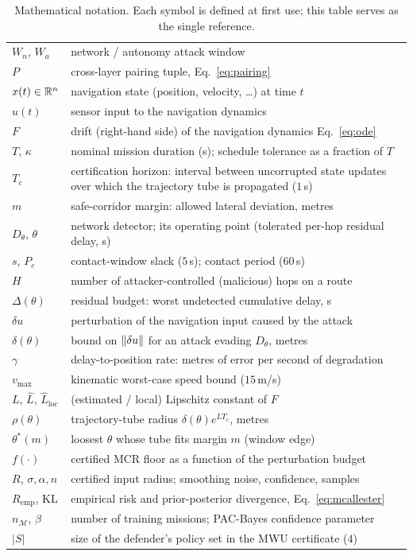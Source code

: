 \begin{table}[t]
\centering
\caption{Mathematical notation. Each symbol is defined at first use; this
table serves as the single reference.}
\label{tab:notation}
\small
\renewcommand{\arraystretch}{1.05}
\begin{tabularx}{\columnwidth}{@{}lX@{}}
\toprule
$W_n$, $W_a$ & network / autonomy attack window\\
$P$ & cross-layer pairing tuple, Eq.~\eqref{eq:pairing}\\
$x(t)\in\mathbb{R}^n$ & navigation state (position, velocity, \dots) at time $t$\\
$u(t)$ & sensor input to the navigation dynamics\\
$F$ & drift (right-hand side) of the navigation dynamics Eq.~\eqref{eq:ode}\\
$T$, $\kappa$ & nominal mission duration (s); schedule tolerance as a
fraction of $T$\\
$T_c$ & certification horizon: interval between uncorrupted state updates
over which the trajectory tube is propagated ($1$\,s)\\
$m$ & safe-corridor margin: allowed lateral deviation, metres\\
$D_\theta$, $\theta$ & network detector; its operating point
(tolerated per-hop residual delay, s)\\
$s$, $P_{\!c}$ & contact-window slack ($5$\,s); contact period ($60$\,s)\\
$H$ & number of attacker-controlled (malicious) hops on a route\\
$\Delta(\theta)$ & residual budget: worst undetected cumulative delay, s\\
$\delta u$ & perturbation of the navigation input caused by the attack\\
$\delta(\theta)$ & bound on $\left\lVert \delta u\right\rVert$ for an attack evading $D_\theta$, metres\\
$\gamma$ & delay-to-position rate: metres of error per second of degradation\\
$v_{\max}$ & kinematic worst-case speed bound ($15$\,m/s)\\
$L$, $\hat L$, $\hat L_{\mathrm{loc}}$ & (estimated / local) Lipschitz constant of $F$\\
$\rho(\theta)$ & trajectory-tube radius $\delta(\theta)e^{LT_c}$, metres\\
$\theta^{*}(m)$ & loosest $\theta$ whose tube fits margin $m$ (window edge)\\
$f(\cdot)$ & certified MCR floor as a function of the perturbation budget\\
$R$, $\sigma,\alpha,n$ & certified input radius; smoothing noise, confidence, samples\\
$R_{\mathrm{emp}}$, $\mathrm{KL}$ & empirical risk and prior-posterior divergence, Eq.~\eqref{eq:mcallester}\\
$n_{\mathcal{M}}$, $\beta$ & number of training missions; PAC-Bayes confidence parameter\\
$|S|$ & size of the defender's policy set in the MWU certificate ($4$)\\
\bottomrule
\end{tabularx}
\end{table}



